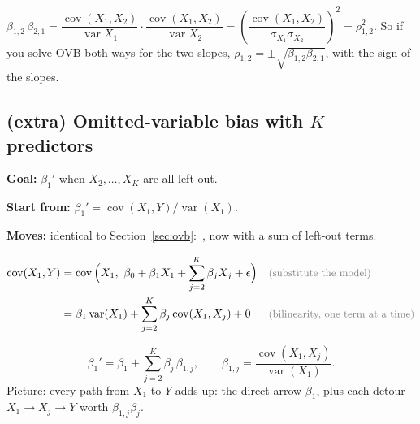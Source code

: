 \documentclass[11pt]{article}
\newcommand{\Var}{\operatorname{var}}
\newcommand{\Cov}{\operatorname{cov}}
\newcommand{\why}[1]{&&\text{\small\color{gray}(#1)}}
\newcommand{\mv}[1]{\tcbox[on line, colback=methodclr, colframe=methodclr, coltext=white, boxsep=0pt,
  left=2pt, right=2pt, top=1pt, bottom=1pt, arc=1.5pt]{\sffamily\scriptsize\bfseries M#1}}
\newcommand{\goal}[1]{\textbf{Goal:} #1\par}
\newcommand{\start}[1]{\textbf{Start from:} #1\par}
\newcommand{\moves}[1]{\textbf{Moves:} #1\par}
\begin{document}
\begin{tipbox}[title={Trick from the crime example: two OVB slopes give the predictor correlation}]
$\beta_{1,2}\,\beta_{2,1}=\dfrac{\Cov(X_1,X_2)}{\Var X_1}\cdot\dfrac{\Cov(X_1,X_2)}{\Var X_2}=\left(\dfrac{\Cov(X_1,X_2)}{\sigma_{X_1}\sigma_{X_2}}\right)^2=\rho_{1,2}^2 .$
So if you solve OVB both ways for the two slopes, $\rho_{1,2}=\pm\sqrt{\beta_{1,2}\beta_{2,1}}$, with the sign of the slopes.
\end{tipbox}

\subsection{(extra) Omitted-variable bias with $K$ predictors}\label{sec:ovbk}
\begin{methodbox}
\goal{$\beta_1'$ when $X_2,\dots,X_K$ are all left out.}
\start{$\beta_1'=\Cov(X_1,Y)/\Var(X_1)$.}
\moves{identical to Section~\ref{sec:ovb}: \mv{1}\,\mv{3}, now with a sum of left-out terms.}
\end{methodbox}
\begin{align*}
\Cov(X_1,Y)&=\Cov\Big(X_1,\ \beta_0+\beta_1X_1+\sum_{j=2}^K\beta_jX_j+\epsilon\Big) \why{substitute the model}\\
&=\beta_1\Var(X_1)+\sum_{j=2}^K\beta_j\Cov(X_1,X_j)+0 \why{bilinearity, one term at a time}
\end{align*}
\begin{keybox}
\[\beta_1'=\beta_1+\sum_{j=2}^K\beta_j\,\beta_{1,j},\qquad\beta_{1,j}=\frac{\Cov(X_1,X_j)}{\Var(X_1)} .\]
Picture: every path from $X_1$ to $Y$ adds up: the direct arrow $\beta_1$, plus each detour $X_1\to X_j\to Y$ worth $\beta_{1,j}\beta_j$.
\end{keybox}
\end{document}
